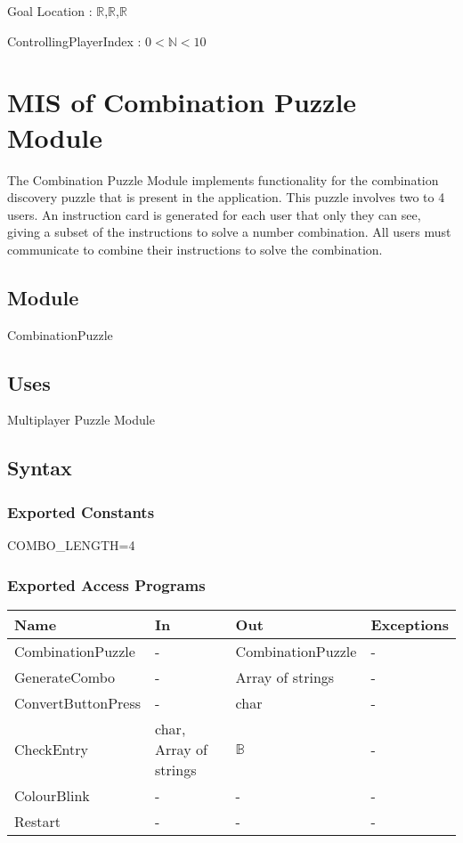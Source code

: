 \documentclass[12pt, titlepage]{article}
\begin{document}
Goal Location : {$\mathbb{R}$,$\mathbb{R}$,$\mathbb{R}$}

\noindent ControllingPlayerIndex : $0<\mathbb{N}<10$

\newpage

\section{MIS of Combination Puzzle Module} \label{sec:Combination} 

\noindent The Combination Puzzle Module implements functionality for the combination discovery puzzle that is present in the application. This puzzle involves two to 4 users. An instruction card is generated for each user that only they can see, giving a subset of the instructions to solve a number combination. All users must communicate to combine their instructions to solve the combination.

\subsection{Module}
CombinationPuzzle

\subsection{Uses}
Multiplayer Puzzle Module

\subsection{Syntax}

\subsubsection{Exported Constants}
COMBO\_LENGTH=4

\subsubsection{Exported Access Programs}

\begin{center}
\begin{tabular}{p{5cm} p{4cm} p{4cm} p{2cm}}
\hline
\textbf{Name} & \textbf{In} & \textbf{Out} & \textbf{Exceptions} \\
\hline
CombinationPuzzle & - & CombinationPuzzle & -\\
GenerateCombo & - & Array of strings & - \\
ConvertButtonPress & - & char & - \\
CheckEntry & char, Array of strings & $\mathds{B}$ & - \\
ColourBlink & - & - & - \\
Restart & - & - & - \\
\hline
\end{tabular}
\end{center}
\end{document}
